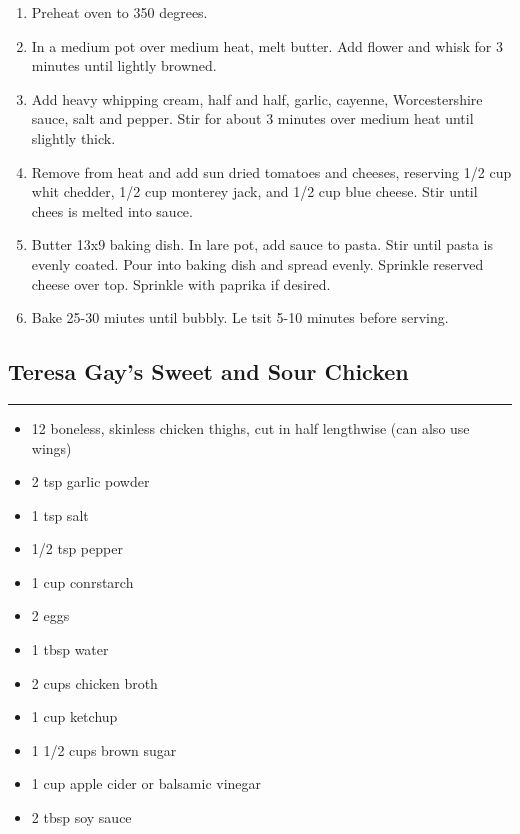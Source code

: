 \documentclass{article}
\begin{document}
\begin{enumerate}
    \item 
        Preheat oven to 350 degrees.
    \item 
        In a medium pot over medium heat, melt butter. Add flower and whisk for 3 minutes until lightly browned.
    \item 
        Add heavy whipping cream, half and half, garlic, cayenne, Worcestershire sauce, salt and pepper. Stir for about 3 minutes over medium heat until slightly thick.
    \item 
        Remove from heat and add sun dried tomatoes and cheeses, reserving 1/2 cup whit chedder, 1/2 cup monterey jack, and 1/2 cup blue cheese. Stir until chees is melted into sauce.
    \item 
        Butter 13x9 baking dish. In lare pot, add sauce to pasta. Stir until pasta is evenly coated. Pour into baking dish and spread evenly. Sprinkle reserved cheese over top. Sprinkle with paprika if desired.
    \item 
        Bake 25-30 miutes until bubbly. Le tsit 5-10 minutes before serving.
\end{enumerate}
\newpage

\subsection{Teresa Gay's Sweet and Sour Chicken} 
\noindent\rule[0.5ex]{\linewidth}{1pt}

\begin{framed}
    \begin{itemize}
        \item 12 boneless, skinless chicken thighs, cut in half lengthwise (can also use wings)
        \item 2 tsp garlic powder
        \item 1 tsp salt
        \item 1/2 tsp pepper
        \item 1 cup conrstarch
        \item 2 eggs
        \item 1 tbsp water
        \item 2 cups chicken broth
        \item 1 cup ketchup
        \item 1 1/2 cups brown sugar
        \item 1 cup apple cider or balsamic vinegar
        \item 2 tbsp soy sauce
    \end{itemize}
\end{framed}
\end{document}
